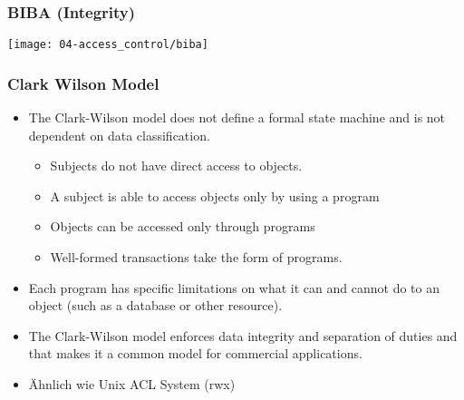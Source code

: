 \subsubsection{BIBA (Integrity)}
\texttt{[image: 04-access\_control/biba]}

\subsubsection{Clark Wilson Model}
\begin{itemize}
    \item The Clark-Wilson model does not define a formal state machine and is not dependent on data classification.
    \begin{itemize}
        \item Subjects do not have direct access to objects.
        \item A subject is able to access objects only by using a program
        \item Objects can be accessed only through programs
        \item Well-formed transactions take the form of programs.
    \end{itemize}
    \item Each program has specific limitations on what it can and cannot do to an object (such as a database or other resource).
    \item The Clark-Wilson model enforces data integrity and separation of duties and that makes it a common model for commercial applications.
    \item Ähnlich wie Unix ACL System (rwx)
\end{itemize}

